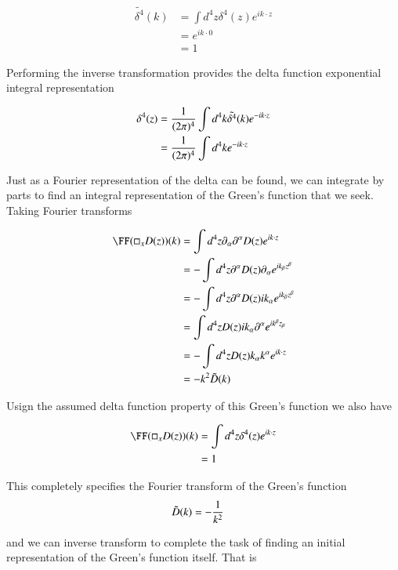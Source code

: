 \begin{align*}
\tilde{\delta^4}(k) 
&= \int d^4 z \delta^4(z) e^{i k \cdot z} \\
&= e^{i k \cdot 0} \\
&= 1
\end{align*}

Performing the inverse transformation provides the delta function exponential integral representation 

\begin{align*}
\delta^4(z) 
&= \frac{1}{(2\pi)^4} \int d^4 k \tilde{\delta^4}(k) e^{-i k \cdot z} \\
&= \frac{1}{(2\pi)^4} \int d^4 k e^{-i k \cdot z} \\
\end{align*}

Just as a Fourier representation of the delta can be found, we can integrate by parts to find an integral representation of the Green's function that we seek.  Taking Fourier transforms

\begin{align*}
\FF(\square_x D(z))(k) 
&= \int d^4 z \partial_\alpha \partial^\alpha D(z) e^{i k \cdot z} \\
&= -\int d^4 z \partial^\alpha D(z) \partial_\alpha e^{i k_\beta z^\beta} \\
&= -\int d^4 z \partial^\alpha D(z) i k_\alpha e^{i k_\beta z^\beta} \\
&= \int d^4 z D(z) i k_\alpha \partial^\alpha e^{i k^\beta z_\beta} \\
&= -\int d^4 z D(z) k_\alpha k^\alpha e^{i k \cdot z } \\
&= - k^2 \tilde{D}(k)
\end{align*}

Usign the assumed delta function property of this Green's function we also have

\begin{align*}
\FF(\square_x D(z))(k) 
&= \int d^4 z \delta^4(z) e^{i k \cdot z} \\
&= 1
\end{align*}

This completely specifies the Fourier transform of the Green's function
\begin{align}\label{eqn:jacksonRet:boo7}
\tilde{D}(k) &= - \frac{1}{k^2}
\end{align}

and we can inverse transform to complete the task of finding an initial representation of the Green's function itself.  That is


